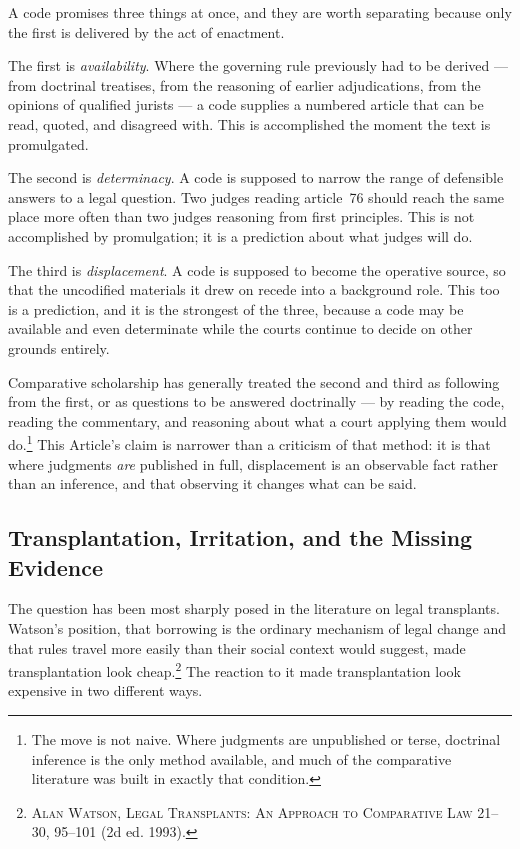\documentclass[12pt]{article}
\newcommand{\bbook}[1]{\textsc{#1}}
\begin{document}
A code promises three things at once, and they are worth separating because
only the first is delivered by the act of enactment.

The first is \emph{availability}. Where the governing rule previously had to
be derived --- from doctrinal treatises, from the reasoning of earlier
adjudications, from the opinions of qualified jurists --- a code supplies a
numbered article that can be read, quoted, and disagreed with. This is
accomplished the moment the text is promulgated.

The second is \emph{determinacy}. A code is supposed to narrow the range of
defensible answers to a legal question. Two judges reading article~76 should
reach the same place more often than two judges reasoning from first
principles. This is not accomplished by promulgation; it is a prediction about
what judges will do.

The third is \emph{displacement}. A code is supposed to become the operative
source, so that the uncodified materials it drew on recede into a background
role. This too is a prediction, and it is the strongest of the three, because
a code may be available and even determinate while the courts continue to
decide on other grounds entirely.

Comparative scholarship has generally treated the second and third as
following from the first, or as questions to be answered doctrinally --- by
reading the code, reading the commentary, and reasoning about what a court
applying them would do.\footnote{The move is not naive. Where judgments are
unpublished or terse, doctrinal inference is the only method available, and
much of the comparative literature was built in exactly that condition.} This
Article's claim is narrower than a criticism of that method: it is that where
judgments \emph{are} published in full, displacement is an observable fact
rather than an inference, and that observing it changes what can be said.

\subsection{Transplantation, Irritation, and the Missing Evidence}
\label{sub:transplant}

The question has been most sharply posed in the literature on legal
transplants. Watson's position, that borrowing is the ordinary mechanism of
legal change and that rules travel more easily than their social context would
suggest, made transplantation look cheap.\footnote{\bbook{Alan Watson, Legal
Transplants: An Approach to Comparative Law} 21--30, 95--101 (2d ed. 1993).}
The reaction to it made transplantation look expensive in two different ways.
\end{document}
